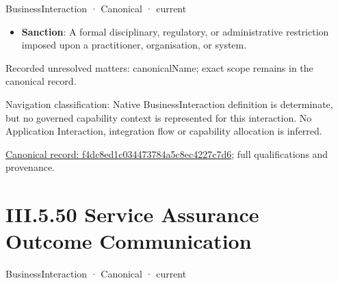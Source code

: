 \label{element:f4dc8ed1c034473784a5c8ec4227c7d6}
{\small BusinessInteraction · Canonical · current}\par

\begin{itemize}


\item \textbf{Sanction}: A formal disciplinary, regulatory, or administrative restriction imposed upon a practitioner, organisation, or system.

\end{itemize}

{\small Recorded unresolved matters: canonicalName; exact scope remains in the canonical record.}\par
{\small Navigation classification: Native BusinessInteraction definition is determinate, but no governed capability context is represented for this interaction. No Application Interaction, integration flow or capability allocation is inferred.}\par
{\footnotesize \href{../../../../../../../continuum/business/business-interaction/f4dc8ed1c034473784a5c8ec4227c7d6.md}{Canonical record: f4dc8ed1c034473784a5c8ec4227c7d6}; full qualifications and provenance.}\par
\section*{III.5.50 Service Assurance Outcome Communication}
\label{navigation:III.5.50}

\label{element:73b6d1ab8ecc48c4bdea98f013288c9c}
{\small BusinessInteraction · Canonical · current}\par

